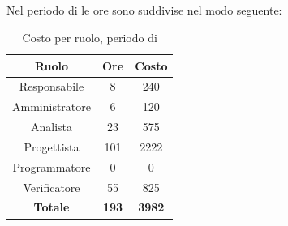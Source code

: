 \subsection{\PA}
Nel periodo di \PA{} le ore sono suddivise nel modo seguente:
\begin{table}[H]
	\centering
	\begin{tabular}{|c|c|c|}
		\hline
		\textbf{Ruolo} &
		\textbf{Ore} &
		\textbf{Costo} \\
		\hline
		Responsabile & 8 & 240\\
		\hline
		Amministratore & 6 & 120\\
		\hline
		Analista & 23 & 575\\
		\hline
		Progettista & 101 & 2222 \\
		\hline
		Programmatore & 0 & 0 \\
		\hline
		Verificatore & 55 & 825\\
		\hline
		\textbf{Totale} & \textbf{193} & \textbf{3982} \\
		\hline
	\end{tabular}
	\caption{Costo per ruolo, periodo di \PA}
\end{table}

